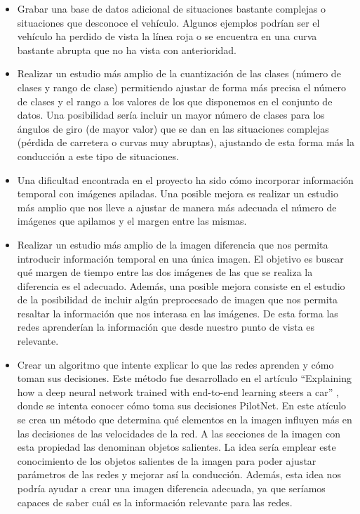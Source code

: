 \begin{itemize}
    \item Grabar una base de datos adicional de situaciones bastante complejas o situaciones que desconoce el vehículo. Algunos ejemplos podrían ser el vehículo ha perdido de vista la línea roja o se encuentra en una curva bastante abrupta que no ha vista con anterioridad. 
    
    \item Realizar un estudio más amplio de la cuantización de las clases (número de clases y rango de clase) permitiendo ajustar de forma más precisa el número de clases y el rango a los valores de los que disponemos en el conjunto de datos. Una posibilidad sería incluir un mayor número de clases para los ángulos de giro (de mayor valor) que se dan en las situaciones complejas (pérdida de carretera o curvas muy abruptas), ajustando de esta  forma más la conducción a este tipo de situaciones.
    
    \item Una dificultad encontrada en el proyecto ha sido cómo incorporar información temporal con imágenes apiladas. Una posible mejora es realizar un estudio más amplio que nos lleve a ajustar de manera más adecuada el número de imágenes que apilamos y el margen entre las mismas.
    
    \item Realizar un estudio más amplio de la imagen diferencia que nos permita introducir información temporal en una única imagen. El objetivo es buscar qué margen de tiempo entre las dos imágenes de las que se realiza la diferencia es el adecuado. Además, una posible mejora consiste en el estudio de la posibilidad de incluir algún preprocesado de imagen que nos permita resaltar la información que nos interasa en las imágenes. De esta forma las redes aprenderían la información que desde nuestro punto de vista es relevante.
    
    \item Crear un algoritmo que intente explicar lo que las redes aprenden y cómo toman sus decisiones. Este método fue desarrollado en el artículo ``Explaining  how  a  deep  neural network trained with end-to-end learning steers a car'' \cite{explaining-end2end} \cite{visual}, donde se intenta conocer cómo toma sus decisiones PilotNet. En este atículo se crea un método que determina qué elementos en la imagen influyen más en las decisiones de las velocidades de la red. A las secciones de la imagen con esta propiedad las denominan objetos salientes. La idea sería emplear este conocimiento de los objetos salientes de la imagen para poder ajustar parámetros de las redes y mejorar así la conducción. Además, esta idea nos podría ayudar a crear una imagen diferencia adecuada, ya que seríamos capaces de saber cuál es la información relevante para las redes.
\end{itemize}
